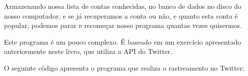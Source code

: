 
Armazenando nossa lista de contas conhecidas, no banco de dados no disco do
nosso computador, e se já recuperamos a conta ou não, e quanto esta conta é
popular, podemos parar e recomeçar nosso programa quantas vezes quisermos.


Este programa é um pouco complexo. É baseado em um exercício apresentado
anteriormente neste livro, que utiliza a API do Twitter.


O seguinte código apresenta o programa que realiza o rastreamento no Twitter:

